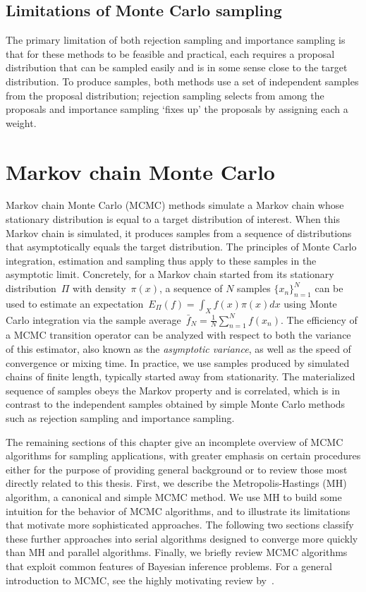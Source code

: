 \documentclass[angelino.tex]{subfiles}
\begin{document}
\subsection{Limitations of Monte Carlo sampling}

The primary limitation of both rejection sampling and importance sampling is
that for these methods to be feasible and practical, each requires a proposal
distribution that can be sampled easily and is in some sense
close to the target distribution.
To produce samples, both methods use a set of
independent samples from the proposal distribution;
rejection sampling selects from among the proposals
and importance sampling `fixes up' the proposals by assigning each a weight.

\section{Markov chain Monte Carlo}

Markov chain Monte Carlo (MCMC) methods simulate a Markov chain whose stationary
distribution is equal to a target distribution of interest.
When this Markov chain is simulated, it produces samples from a sequence of
distributions that asymptotically equals the target distribution.
The principles of Monte Carlo integration, estimation and sampling thus apply to 
these samples in the asymptotic limit.
Concretely, for a Markov chain started from its stationary distribution~$\Pi$
with density~$\pi(x)$, a sequence of $N$ samples $\{x_n\}_{n=1}^N$ can be used
to estimate an expectation~$E_\Pi(f) = \int_X f(x) \pi(x) dx$ using Monte Carlo
integration via the sample average~$\bar{f}_N = \frac{1}{N} \sum_{n=1}^N f(x_n)$.
The efficiency of a MCMC transition operator can be analyzed with respect to
both the variance of this estimator, also known as the
\emph{asymptotic variance}, as well as the speed of convergence or mixing time.
In practice, we use samples produced by simulated chains of finite length,
typically started away from stationarity.
The materialized sequence of samples obeys the Markov property and is
correlated, which is in contrast to the independent samples obtained by simple
Monte Carlo methods such as rejection sampling and importance sampling.

The remaining sections of this chapter give an incomplete overview of
MCMC algorithms for sampling applications, with greater emphasis on
certain procedures either for the purpose of providing general background
or to review those most directly related to this thesis.
First, we describe the Metropolis-Hastings (MH) algorithm, a canonical and
simple MCMC method.
We use MH to build some intuition for the behavior of MCMC algorithms,
and to illustrate its limitations that motivate more sophisticated approaches.
The following two sections classify these further approaches into serial
algorithms designed to converge more quickly than MH and parallel algorithms.
Finally, we briefly review MCMC algorithms that exploit common features of
Bayesian inference problems.
For a general introduction to MCMC, see the highly motivating review by~\citet{diaconis-2008-revolution}.
\end{document}
